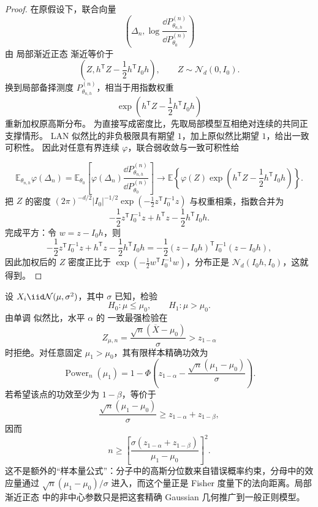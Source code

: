 \begin{proof}
在原假设下，联合向量
\[
 \left(
 \Delta_n,
 \log\frac{\dd P_{\theta_{n,h}}^{(n)}}
 {\dd P_{\theta_0}^{(n)}}
 \right)
\]
由 局部渐近正态 渐近等价于
\[
 \left(
 Z,
 h^{\mathsf T}Z-\frac12h^{\mathsf T}I_0h
 \right),
 \qquad
 Z\sim\mathcal N_d(0,I_0).
\]
换到局部备择测度 $P_{\theta_{n,h}}^{(n)}$，相当于用指数权重
\[
 \exp\!\left(
 h^{\mathsf T}Z-\frac12h^{\mathsf T}I_0h
 \right)
\]
重新加权原高斯分布。
为直接写成密度比，先取局部模型互相绝对连续的共同正支撑情形。
LAN 似然比的非负极限具有期望 $1$，加上原似然比期望 $1$，给出一致可积性。
因此对任意有界连续 $\varphi$，联合弱收敛与一致可积性给

\[
\mathbb E_{\theta_{n,h}}\varphi(\Delta_n)
=\mathbb E_{\theta_0}\!\left[
\varphi(\Delta_n)\frac{\dd P_{\theta_{n,h}}^{(n)}}{\dd P_{\theta_0}^{(n)}}
\right]
\longrightarrow\mathbb E\!\left\{
\varphi(Z)\exp\!\left(h^{\mathsf T}Z-\frac12h^{\mathsf T}I_0h\right)
\right\}.
\]
把 $Z$ 的密度 $(2\pi)^{-d/2}|I_0|^{-1/2}\exp(-\frac12z^{\mathsf T}I_0^{-1}z)$ 与权重相乘，指数合并为
\[
 -\frac12z^{\mathsf T}I_0^{-1}z
 +h^{\mathsf T}z
 -\frac12h^{\mathsf T}I_0h.
\]
完成平方：令 $w=z-I_0h$，则
\[
 -\frac12z^{\mathsf T}I_0^{-1}z
 +h^{\mathsf T}z
 -\frac12h^{\mathsf T}I_0h
 =-\frac12(z-I_0h)^{\mathsf T}
 I_0^{-1}(z-I_0h),
\]
因此加权后的 $Z$ 密度正比于 $\exp(-\frac12w^{\mathsf T}I_0^{-1}w)$，分布正是 $\mathcal N_d(I_0h,I_0)$，这就得到。
\end{proof}


\begin{exbox}[正态均值设计把功效写成标准化法向距离]
设 $X_i\iid\mathcal N(\mu,\sigma^2)$，其中 $\sigma$ 已知，检验
\[
 H_0:\mu\le\mu_0,
 \qquad
 H_1:\mu>\mu_0.
\]
由单调 似然比，水平 $\alpha$ 的 一致最强检验在
\[
 Z_{\mu,n}=\frac{\sqrt n(\overline X-\mu_0)}{\sigma}
 >z_{1-\alpha}
\]
时拒绝。对任意固定 $\mu_1>\mu_0$，其有限样本精确功效为
\[
 \operatorname{Power}_n(\mu_1)
 =1-\Phi\!\left(
 z_{1-\alpha}
 -\frac{\sqrt n(\mu_1-\mu_0)}{\sigma}
 \right).
\]
若希望该点的功效至少为 $1-\beta$，等价于
\[
 \frac{\sqrt n(\mu_1-\mu_0)}{\sigma}
 \ge z_{1-\alpha}+z_{1-\beta},
\]
因而
\[
 n\ge
 \left[
 \frac{\sigma(z_{1-\alpha}+z_{1-\beta})}
 {\mu_1-\mu_0}
 \right]^2.
\]
这不是额外的“样本量公式”：分子中的高斯分位数来自错误概率约束，分母中的效应量通过 $\sqrt n(\mu_1-\mu_0)/\sigma$ 进入，而这个量正是 Fisher 度量下的法向距离。局部渐近正态 中的非中心参数只是把这套精确 Gaussian 几何推广到一般正则模型。
\end{exbox}

